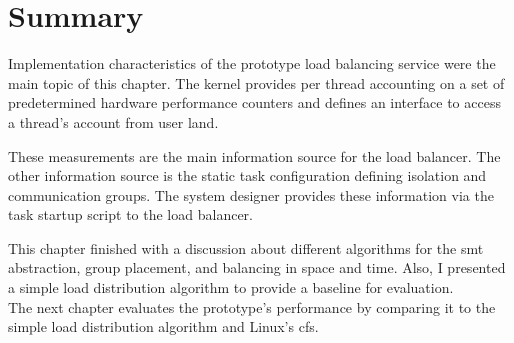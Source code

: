 \section{Summary}
\label{impl:summary}

Implementation characteristics of the prototype load balancing service were the
main topic of this chapter.
The kernel provides per thread accounting on a set of predetermined hardware
performance counters and defines an interface to access a thread's account from
user land.

These measurements are the main information source for the load balancer.
The other information source is the static task configuration defining
isolation and communication groups.
The system designer provides these information via the task startup script to
the load balancer.

This chapter finished with a discussion about different algorithms for the
\gls{smt} abstraction, group placement, and balancing in space and time.
Also, I presented a simple load distribution algorithm to provide a baseline for
evaluation.
\\

The next chapter evaluates the prototype's performance by comparing it to the
simple load distribution algorithm and Linux's \gls{cfs}.
